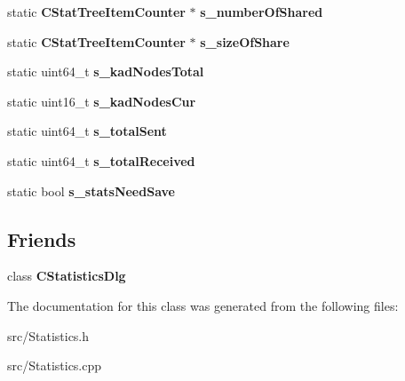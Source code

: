 \begin{DoxyCompactItemize}
\item 
static {\bf CStatTreeItemCounter} $\ast$ {\bfseries s\_\-numberOfShared}\label{classCStatistics_ac0e659a81a347af66bdd1ea064571269}

\item 
static {\bf CStatTreeItemCounter} $\ast$ {\bfseries s\_\-sizeOfShare}\label{classCStatistics_a528462318e2efac05e4720c9b16f37c3}

\item 
static uint64\_\-t {\bfseries s\_\-kadNodesTotal}\label{classCStatistics_a3844bf31a01e68bf2cc625d0b5a9cdf8}

\item 
static uint16\_\-t {\bfseries s\_\-kadNodesCur}\label{classCStatistics_abb198195e2b691bff95898ce1918b051}

\item 
static uint64\_\-t {\bfseries s\_\-totalSent}\label{classCStatistics_a2481790aca5dc52fe8c1a3c63411017f}

\item 
static uint64\_\-t {\bfseries s\_\-totalReceived}\label{classCStatistics_a96dba72d731c67621a668af69f852cb1}

\item 
static bool {\bfseries s\_\-statsNeedSave}\label{classCStatistics_a772c0953fd4f58c39fde535e9df9a4bd}

\end{DoxyCompactItemize}
\subsection*{Friends}
\begin{DoxyCompactItemize}
\item 
class {\bf CStatisticsDlg}\label{classCStatistics_ad52500fde9069f98bae7c29011758806}

\end{DoxyCompactItemize}


The documentation for this class was generated from the following files:\begin{DoxyCompactItemize}
\item 
src/Statistics.h\item 
src/Statistics.cpp\end{DoxyCompactItemize}
